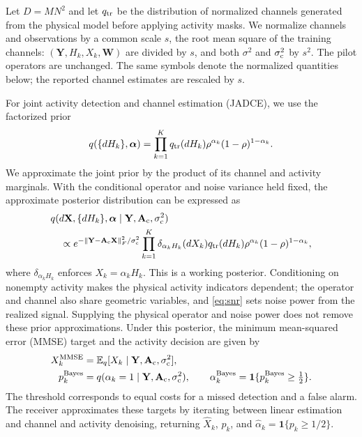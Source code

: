 Let $D=MN^2$ and let $q_{\rm tr}$ be the distribution of normalized channels
generated from the physical model before applying activity masks.
We normalize channels and observations by a common scale $s$,
the root mean square of the training channels:
$(\mathbf Y,H_k,X_k,\mathbf W)$ are divided by $s$, and both
$\sigma^2$ and $\sigma_{\rm c}^2$ by $s^2$. The pilot operators are
unchanged. The same symbols denote the normalized quantities below;
the reported channel estimates are rescaled by $s$.

For joint activity detection and channel estimation (JADCE), we use
the factorized prior
\begin{equation}
 q(\{dH_k\},\bm\alpha)=
 \prod_{k=1}^{K}q_{\rm tr}(dH_k)
 \rho^{\alpha_k}(1-\rho)^{1-\alpha_k}.
 \label{eq:working-prior}
\end{equation}
We approximate the joint prior by the product of its channel
and activity marginals. With the conditional operator and noise variance
held fixed, the approximate posterior distribution can be expressed as
\begin{equation}
 \begin{aligned}
 &q(d\mathbf X,\{dH_k\},\bm\alpha\mid
 \mathbf Y,\mathbf A_{\rm c},\sigma_{\rm c}^2)\\
 &\quad\propto
 e^{-\left\lVert\mathbf Y-\mathbf A_{\rm c}\mathbf X\right\rVert_F^2/\sigma_{\rm c}^2}
 \prod_{k=1}^{K}
 \delta_{\alpha_kH_k}(dX_k)q_{\rm tr}(dH_k)
 \rho^{\alpha_k}(1-\rho)^{1-\alpha_k},
 \end{aligned}
 \label{eq:working-posterior}
\end{equation}
where $\delta_{\alpha_kH_k}$ enforces $X_k=\alpha_kH_k$.
This is a working posterior. Conditioning on nonempty activity makes
the physical activity indicators dependent; the operator and channel
also share geometric variables, and \eqref{eq:snr} sets noise power
from the realized signal. Supplying the physical operator and noise
power does not remove these prior approximations.
Under this posterior, the minimum mean-squared error (MMSE) target
and the activity decision are given by
\begin{equation}
 \begin{aligned}
 X_k^{\rm MMSE}&=\mathbb{E}_q[X_k\mid\mathbf Y,\mathbf A_{\rm c},\sigma_{\rm c}^2],\\
 p_k^{\rm Bayes}&=q(\alpha_k=1\mid\mathbf Y,\mathbf A_{\rm c},\sigma_{\rm c}^2),\qquad
 \alpha_k^{\rm Bayes}=\mathbf1\{p_k^{\rm Bayes}\geq\tfrac12\}.
 \end{aligned}
 \label{eq:targets}
\end{equation}
The threshold corresponds to equal costs for a missed detection and a
false alarm. The receiver approximates these targets by iterating between
linear estimation and channel and activity denoising, returning
$\widehat X_k$, $p_k$, and $\widehat\alpha_k=\mathbf1\{p_k\geq1/2\}$.
